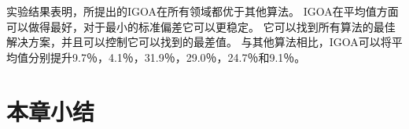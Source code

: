 实验结果表明，所提出的IGOA在所有领域都优于其他算法。 IGOA在平均值方面可以做得最好，对于最小的标准偏差它可以更稳定。 它可以找到所有算法的最佳解决方案，并且可以控制它可以找到的最差值。 与其他算法相比，IGOA可以将平均值分别提升9.7％，4.1％，31.9％，29.0％，24.7％和9.1％。

\section{本章小结}\label{sec:task_scheduling_summary}